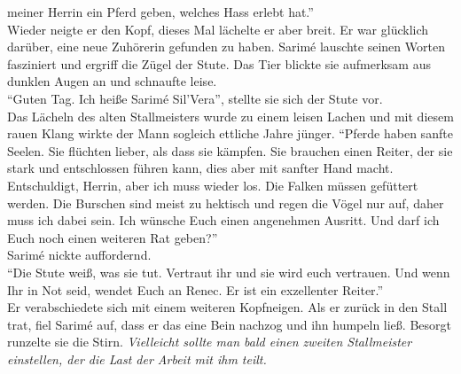meiner Herrin ein Pferd geben, welches Hass erlebt hat.''\\
Wieder neigte er den Kopf, dieses Mal lächelte er aber breit. Er war glücklich darüber, eine neue 
Zuhörerin gefunden zu haben. Sarimé lauschte seinen Worten fasziniert und ergriff die Zügel der 
Stute. Das Tier blickte sie aufmerksam aus dunklen Augen an und schnaufte leise. \\
``Guten Tag. Ich heiße Sarimé Sil'Vera'', stellte sie sich der Stute vor. \\
Das Lächeln des alten Stallmeisters wurde zu einem leisen Lachen und mit diesem rauen Klang wirkte 
der Mann sogleich ettliche Jahre jünger. ``Pferde haben sanfte Seelen. Sie flüchten lieber, als 
dass sie kämpfen. Sie brauchen einen Reiter, der sie stark und entschlossen führen kann, dies aber 
mit sanfter Hand macht. Entschuldigt, Herrin, aber ich muss wieder los. Die Falken müssen gefüttert 
werden. Die Burschen sind meist zu hektisch und regen die Vögel nur auf, daher muss ich dabei sein. 
Ich wünsche Euch einen angenehmen Ausritt. Und darf ich Euch noch einen weiteren Rat geben?''\\
Sarimé nickte auffordernd.\\
``Die Stute weiß, was sie tut. Vertraut ihr und sie wird euch vertrauen. Und wenn Ihr in Not seid, 
wendet Euch an Renec. Er ist ein exzellenter Reiter.''\\
Er verabschiedete sich mit einem weiteren Kopfneigen. Als er zurück in den Stall trat, fiel Sarimé 
auf, dass er das eine Bein nachzog und ihn humpeln ließ. Besorgt runzelte sie die Stirn. 
\textit{Vielleicht sollte man bald einen zweiten Stallmeister einstellen, der die Last der Arbeit 
mit ihm teilt.}\\

